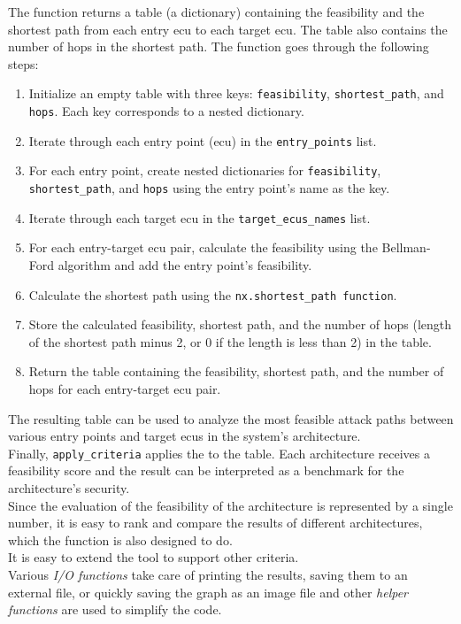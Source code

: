The function returns a table (a dictionary) containing the feasibility and the shortest path from each entry \gls{ecu} to each target \gls{ecu}. 
The table also contains the number of hops in the shortest path.
The function goes through the following steps:

\begin{enumerate}
    \item Initialize an empty table with three keys: \texttt{feasibility}, \texttt{shortest\_path}, and \texttt{hops}. 
        Each key corresponds to a nested dictionary.
    \item Iterate through each entry point (\gls{ecu}) in the \texttt{entry\_points} list.
    \item For each entry point, create nested dictionaries for \texttt{feasibility}, \texttt{shortest\_path}, and \texttt{hops} using the entry point's name as the key.
    \item Iterate through each target \gls{ecu} in the \texttt{target\_ecus\_names} list.
    \item For each entry-target \gls{ecu} pair, calculate the feasibility using the Bellman-Ford algorithm and add the entry point's feasibility.
    \item Calculate the shortest path using the \texttt{nx.shortest\_path function}.
    \item Store the calculated feasibility, shortest path, and the number of hops (length of the shortest path minus 2, or 0 if the length is less than 2) in the table.
    \item Return the table containing the feasibility, shortest path, and the number of hops for each entry-target \gls{ecu} pair.
\end{enumerate}

The resulting table can be used to analyze the most feasible attack paths between various entry points and target \gls{ecu}s in the system's architecture.\\


Finally, \texttt{apply\_criteria} applies the  to the table.
Each architecture receives a feasibility score and the result can be interpreted as a benchmark for the architecture's security.\\
Since the evaluation of the feasibility of the architecture is represented by a single number, 
it is easy to rank and compare the results of different architectures, which the function is also designed to do.\\

It is easy to extend the tool to support other criteria.\\

Various \textit{I/O functions} take care of printing the results, saving them to an external file, or quickly saving the graph as an image file
and other \textit{helper functions} are used to simplify the code.
